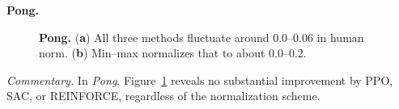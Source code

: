 \noindent \textbf{Pong.}
\begin{figure} 
	\centering
	\quad
	\caption{\textbf{Pong.}
		(\textbf{a}) All three methods fluctuate around 0.0--0.06 in human norm.
		(\textbf{b}) Min--max normalizes that to about 0.0--0.2.}
	\label{fig:pong_combined}
\end{figure}

\noindent
\emph{Commentary.} In \emph{Pong}, Figure~\ref{fig:pong_combined} reveals no substantial improvement by PPO, SAC, or REINFORCE, regardless of the normalization scheme.


